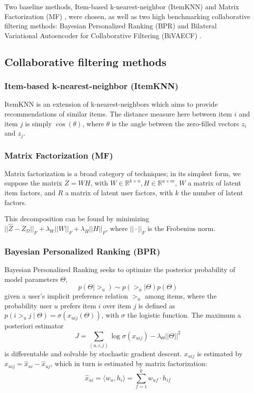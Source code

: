 \documentclass{article}
\begin{document}
Two baseline methods, Item-based k-nearest-neighbor (ItemKNN) \cite{ItemKNN} and Matrix Factorization
(MF) \cite{koren_matrix_2009}, were chosen, as well as two high
benchmarking collaborative filtering methods: Bayesian Personalized
Ranking (BPR) \cite{BPR} and Bilateral Variational Autoencoder for Collaborative
Filtering (BiVAECF) \cite{BiVAECF}.

\subsection{Collaborative filtering methods}

\subsubsection{Item-based k-nearest-neighbor (ItemKNN)}

ItemKNN is an extension of k-nearest-neighbors which aims to provide
recommendations of similar items.  The distance measure here between
item $i$ and item $j$ is simply $\cos(\theta)$, where $\theta$ is the
angle between the zero-filled vectors $z_i$ and $z_j$.

\subsubsection{Matrix Factorization (MF)}

Matrix factorization is a broad category of techniques; in its simplest
form, we suppose the matrix $Z = WH$, with $W \in \mathbb{R}^{k\times
    n}, H \in \mathbb{R}^{u\times m}$, $W$ a matrix of latent item factors,
and $R$ a matrix of latent user factors, with $k$ the number of latent
factors.

This decomposition can be found by minimizing $||\hat{Z} - Z_\Omega||_F
  + \lambda_W||W||_F + \lambda_H||H||_F$, where $||\cdot||_F$ is the Frobenius
norm.

\subsubsection{Bayesian Personalized Ranking (BPR)}

Bayesian Personalized Ranking seeks to optimize the posterior
probability of model parameters $\Theta$, $$p(\Theta | >_u) \sim
  p(>_u|\Theta)p(\Theta)$$ given a user's implicit preference relation
$>_u$ among items, where the probability user $u$ prefers item $i$ over
item $j$ is defined as $p(i >_{u} j \mid \Theta) = \sigma
  (x_{uij}(\Theta))$, with $\sigma$ the logistic function.  The
maximum a posteriori estimator $$J = \sum_{(u, i, j)} \log
  \sigma(x_{uij}) - \lambda_{\Theta} ||\Theta||^2$$ is differentable
and solvable by stochastic gradient descent.  $x_{uij}$ is estimated by
$\hat{x}_{uij} = \hat{x}_{ui} - \hat{x}_{uj}$, which in turn is estimated by matrix factorization:
$$ \hat{x}_{ui} = \langle w_u , h_i \rangle = \sum_{f=1}^{k} w_{uf} \cdot h_{if} $$
\end{document}
